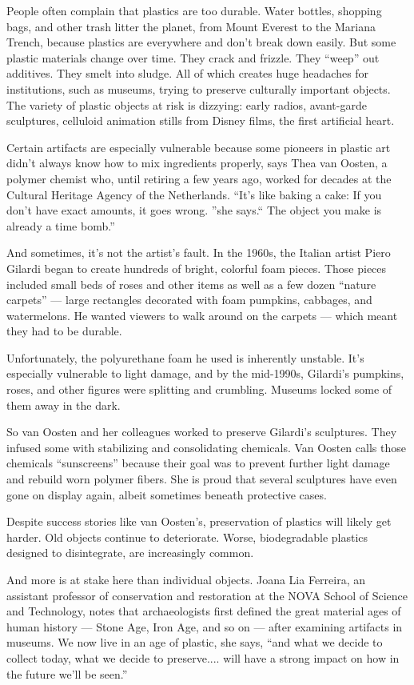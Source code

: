 People often complain that plastics are too durable. Water bottles, shopping bags, and other trash litter the planet, from Mount Everest to the Mariana Trench, because plastics are everywhere and don't break down easily. But some plastic materials change over time. They crack and frizzle. They ``weep'' out additives. They smelt into sludge. All of which creates huge headaches for institutions, such as museums, trying to preserve culturally important objects. The variety of plastic objects at risk is dizzying: early radios, avant-garde sculptures, celluloid animation stills from Disney films, the first artificial heart.


Certain artifacts are especially vulnerable because some pioneers in plastic art didn't always know how to mix ingredients properly, says Thea van Oosten, a polymer chemist who, until retiring a few years ago, worked for decades at the Cultural Heritage Agency of the Netherlands. ``It's like baking a cake: If you don't have exact amounts, it goes wrong. ''she says.`` The object you make is already a time bomb.''


And sometimes, it's not the artist's fault. In the 1960s, the Italian artist Piero Gilardi began to create hundreds of bright, colorful foam pieces. Those pieces included small beds of roses and other items as well as a few dozen ``nature carpets'' — large rectangles decorated with foam pumpkins, cabbages, and watermelons. He wanted viewers to walk around on the carpets — which meant they had to be durable.


Unfortunately, the polyurethane foam he used is inherently unstable. It's especially vulnerable to light damage, and by the mid-1990s, Gilardi's pumpkins, roses, and other figures were splitting and crumbling. Museums locked some of them away in the dark.


So van Oosten and her colleagues worked to preserve Gilardi's sculptures. They infused some with stabilizing and consolidating chemicals. Van Oosten calls those chemicals ``sunscreens'' because their goal was to prevent further light damage and rebuild worn polymer fibers. She is proud that several sculptures have even gone on display again, albeit sometimes beneath protective cases.


Despite success stories like van Oosten's, preservation of plastics will likely get harder. Old objects continue to deteriorate. Worse, biodegradable plastics designed to disintegrate, are increasingly common.


And more is at stake here than individual objects. Joana Lia Ferreira, an assistant professor of conservation and restoration at the NOVA School of Science and Technology, notes that archaeologists first defined the great material ages of human history — Stone Age, Iron Age, and so on — after examining artifacts in museums. We now live in an age of plastic, she says, ``and what we decide to collect today, what we decide to preserve.... will have a strong impact on how in the future we'll be seen.''